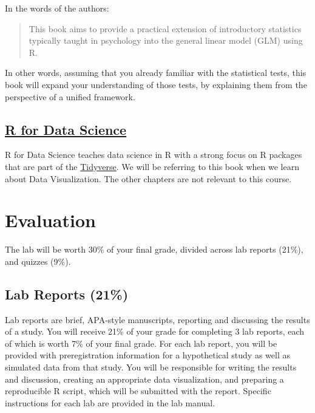 \documentclass[
]{book}
\begin{document}
In the words of the authors:

\begin{quote}
This book aims to provide a practical extension of introductory statistics typically taught in psychology into the general linear model (GLM) using R.
\end{quote}

In other words, assuming that you already familiar with the statistical tests, this book will expand your understanding of those tests, by explaining them from the perspective of a unified framework.

\hypertarget{r-for-data-science}{%
\subsection*{\texorpdfstring{\href{https://r4ds.had.co.nz/}{R for Data Science}}{R for Data Science}}\label{r-for-data-science}}

R for Data Science teaches data science in R with a strong focus on R packages that are part of the \href{https://www.tidyverse.org/}{Tidyverse}. We will be referring to this book when we learn about Data Visualization. The other chapters are not relevant to this course.

\hypertarget{evaluation}{%
\section*{Evaluation}\label{evaluation}}

The lab will be worth 30\% of your final grade, divided across lab reports (21\%), and quizzes (9\%).

\hypertarget{lab-reports-21}{%
\subsection*{Lab Reports (21\%)}\label{lab-reports-21}}

Lab reports are brief, APA-style manuscripts, reporting and discussing the results of a study. You will receive 21\% of your grade for completing 3 lab reports, each of which is worth 7\% of your final grade. For each lab report, you will be provided with preregistration information for a hypothetical study as well as simulated data from that study. You will be responsible for writing the results and discussion, creating an appropriate data visualization, and preparing a reproducible R script, which will be submitted with the report. Specific instructions for each lab are provided in the lab manual.
\end{document}

